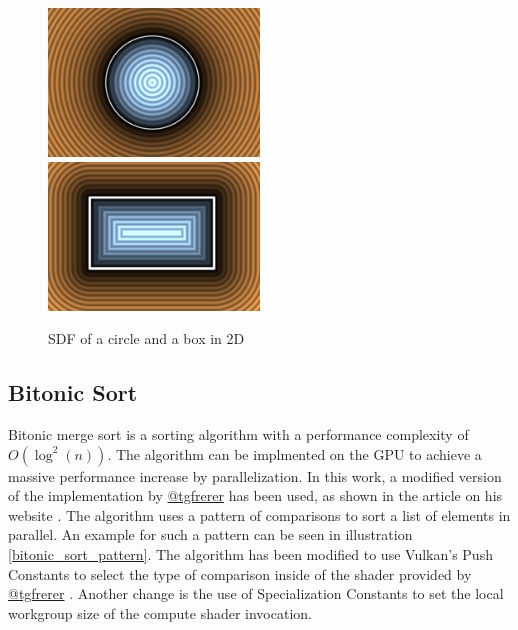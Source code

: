 \documentclass[intern]{cgMA}
\begin{document}
    \begin{figure}[H]
        \includegraphics[width=0.5\textwidth]{figures/gfx00.png}
        \includegraphics[width=0.5\textwidth]{figures/gfx02.png}
        \caption[SDF of a circle and a box in 2D \cite{iquilezles2}]{SDF of a circle and a box in 2D}
        \label{fig:sdf}
    \end{figure}

    \subsection{Bitonic Sort}

    Bitonic merge sort is a sorting algorithm with a performance complexity of $O(\log^2(n))$. The algorithm can be implmented on the GPU to achieve a massive performance increase by parallelization. In this work, a modified version of the implementation by \href{https://twitter.com/tgfrerer}{@tgfrerer} has been used, as shown in the article on his website \cite{bitonic}. The algorithm uses a pattern of comparisons to sort a list of elements in parallel. An example for such a pattern can be seen in illustration \ref{bitonic_sort_pattern}. The algorithm has been modified to use Vulkan's Push Constants to select the type of comparison inside of the shader provided by \href{https://twitter.com/tgfrerer}{@tgfrerer} \cite{bitonic}. Another change is the use of Specialization Constants to set the local workgroup size of the compute shader invocation.
\end{document}

